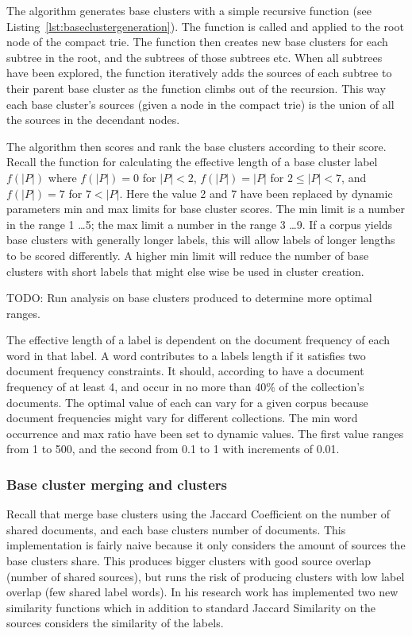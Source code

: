 The \CTC algorithm generates base clusters with a simple recursive function (see Listing~\ref{lst:baseclustergeneration}). The function is called and applied to the root node of the compact trie. The function then creates new base clusters for each subtree in the root, and the subtrees of those subtrees etc. When all subtrees have been explored, the function iteratively adds the sources of each subtree to their parent base cluster as the function climbs out of the recursion. This way each base cluster's sources (given a node in the compact trie) is the union of all the sources in the decendant nodes.

The algorithm then scores and rank the base clusters according to their score. Recall the function for calculating the effective length of a base cluster label \(f(\vert P \vert)\) where \(f(\vert P \vert) = 0\) for \(\vert P \vert < 2\), \(f(\vert P \vert) = \vert P \vert\) for \(2 \le \vert P \vert < 7\), and \(f(\vert P \vert) = 7\) for \(7 < \vert P \vert\). Here the value 2 and 7 have been replaced by dynamic parameters min and max limits for base cluster scores. The min limit is a number in the range 1 \dots 5; the max limit a number in the range 3 \dots 9. If a corpus yields base clusters with generally longer labels, this will allow labels of longer lengths to be scored differently. A higher min limit will reduce the number of base clusters with short labels that might else wise be used in cluster creation.

TODO: Run analysis on base clusters produced to determine more optimal ranges.

The effective length of a label is dependent on the document frequency of each word in that label. A word contributes to a labels length if it satisfies two document frequency constraints. It should, according to \cite{Oren1998} have a document frequency of at least 4, and occur in no more than 40\% of the collection's documents. The optimal value of each can vary for a given corpus because document frequencies might vary for different collections. The min word occurrence and max ratio have been set to dynamic values. The first value ranges from 1 to 500, and the second from 0.1 to 1 with increments of 0.01.

\subsubsection{Base cluster merging and clusters}
Recall that \cite{Oren1998} merge base clusters using the Jaccard Coefficient on the number of shared documents, and each base clusters number of documents. This implementation is fairly naive because it only considers the amount of sources the base clusters share. This produces bigger clusters with good source overlap (number of shared sources), but runs the risk of producing clusters with low label overlap (few shared label words). In his research work \supervisor has implemented two new similarity functions which in addition to standard Jaccard Similarity on the sources considers the similarity of the labels. 

